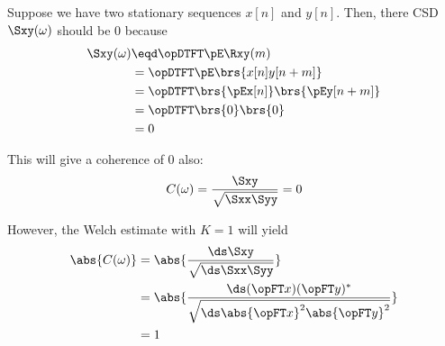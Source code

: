\begin{example}[The Welch estimate of \ope{coherence} with $K=1$]
Suppose we have two  stationary sequences $x[n]$ and $y[n]$. Then, there 
CSD $\Sxy(\omega)$ should be $0$ because
\begin{align*}
  \Sxy(\omega)
    &\eqd \opDTFT\pE\Rxy(m)
  \\&=    \opDTFT\pE\brs{x[n]y[n+m]}
  \\&=    \opDTFT\brs{\pEx[n]} \brs{\pEy[n+m]}
  \\&=    \opDTFT\brs{0} \brs{0}
  \\&=    0
\end{align*}

This will give a coherence of $0$ also:
\[ C(\omega) = \frac{\Sxy}{\sqrt{\Sxx\Syy}} = 0\]

However, the Welch estimate with $K=1$ will yield
\begin{align*}
  \abs{C(\omega)}
    &= \abs{\frac{\ds\Sxy}{\sqrt{\ds\Sxx\Syy}}}
  \\&= \abs{\frac{\ds (\opFT x)(\opFT y)^\ast}{\sqrt{\ds\abs{\opFT x}^2\abs{\opFT y}^2}}}
  \\&= 1
\end{align*}

\end{example}


